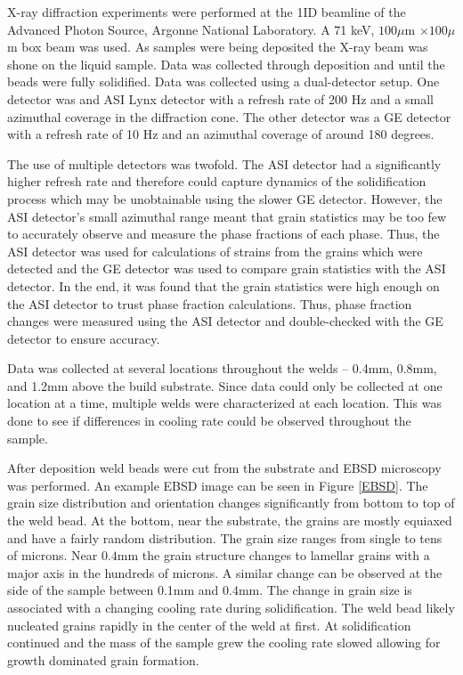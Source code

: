 \documentclass[twocolumn,nofootinbib,notitlepage,aps]{revtex4-1}
\begin{document}
X-ray diffraction experiments were performed at the 1ID beamline of the Advanced Photon Source, Argonne National Laboratory. A 71 keV, $100\mu$m $\times 100 \mu$m box beam was used. As samples were being deposited the X-ray beam was shone on the liquid sample. Data was collected through deposition and until the beads were fully solidified. Data was collected using a dual-detector setup. One detector was and ASI Lynx detector \cite{LynX} with a refresh rate of 200 Hz and a small azimuthal coverage in the diffraction cone. The other detector was a GE detector with a refresh rate of 10 Hz and an azimuthal coverage of around 180 degrees. 

The use of multiple detectors was twofold. The ASI detector had a significantly higher refresh rate and therefore could capture dynamics of the solidification process which may be unobtainable using the slower GE detector. However, the ASI detector's small azimuthal range meant that grain statistics may be too few to accurately observe and measure the phase fractions of each phase. Thus, the ASI detector was used for calculations of strains from the grains which were detected and the GE detector was used to compare grain statistics with the ASI detector. In the end, it was found that the grain statistics were high enough on the ASI detector to trust phase fraction calculations. Thus, phase fraction changes were measured using the ASI detector and double-checked with the GE detector to ensure accuracy.

Data was collected at several locations throughout the welds -- 0.4mm, 0.8mm, and 1.2mm above the build substrate. Since data could only be collected at one location at a time, multiple welds were characterized at each location. This was done to see if differences in cooling rate could be observed throughout the sample.

After deposition weld beads were cut from the substrate and EBSD microscopy was performed. An example EBSD image can be seen in Figure \ref{EBSD}. The grain size distribution and orientation changes significantly from bottom to top of the weld bead. At the bottom, near the substrate, the grains are mostly equiaxed and have a fairly random distribution. The grain size ranges from single to tens of microns. Near $0.4$mm the grain structure changes to lamellar grains with a major axis in the hundreds of microns. A similar change can be observed at the side of the sample between 0.1mm and 0.4mm. The change in grain size is associated with a changing cooling rate during solidification. The weld bead likely nucleated grains rapidly in the center of the weld at first. At solidification continued and the mass of the sample grew the cooling rate slowed allowing for growth dominated grain formation.
\end{document}
